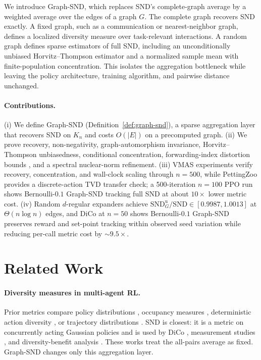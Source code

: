 \documentclass{article}
\theoremstyle{plain}
\theoremstyle{definition}
\theoremstyle{remark}
\newcommand{\SND}{\ensuremath{\mathrm{SND}}}
\newcommand{\SNDG}{\mathrm{SND}_{G}}
\begin{document}
We introduce Graph-SND, which replaces SND's complete-graph average by a
weighted average over the edges of a graph $G$. The complete graph recovers
SND exactly. A fixed graph, such as a communication or nearest-neighbor
graph, defines a localized diversity measure over task-relevant
interactions. A random graph defines sparse estimators of full SND,
including an unconditionally unbiased Horvitz--Thompson estimator and a
normalized sample mean with finite-population concentration. This isolates
the aggregation bottleneck while leaving the policy architecture, training
algorithm, and pairwise distance unchanged.

\paragraph{Contributions.}
(i) We define Graph-SND (Definition~\ref{def:graph-snd}), a sparse
aggregation layer that recovers SND on $K_n$ and costs $O(|E|)$ on a
precomputed graph. (ii) We prove recovery, non-negativity,
graph-automorphism invariance, Horvitz--Thompson unbiasedness,
conditional concentration, forwarding-index distortion bounds
\citep{heydemann1989forwarding,leighton1999multicommodity}, and a
spectral nuclear-norm refinement. (iii) VMAS experiments
\citep{bettini2022vmas} verify recovery, concentration, and wall-clock
scaling through $n=500$, while PettingZoo provides a discrete-action
TVD transfer check; a 500-iteration $n=100$ PPO run
shows Bernoulli-$0.1$ Graph-SND tracking full SND at about $10\times$
lower metric cost. (iv) Random $d$-regular expanders achieve
$\SNDG^{\mathrm{u}}/\SND\in[0.9987,1.0013]$ at
$\Theta(n\log n)$ edges, and DiCo at $n=50$ shows Bernoulli-$0.1$
Graph-SND preserves reward and set-point tracking within observed seed
variation while reducing per-call metric cost by ${\sim}9.5\times$.

\section{Related Work}
\label{sec:related}

\paragraph{Diversity measures in multi-agent RL.}
Prior metrics compare policy distributions
\citep{mckee2022diversity,yu2021informative,hu2022policy}, occupancy
measures \citep{liu2021unifying}, deterministic action diversity
\citep{parker-holder2020effective}, or trajectory distributions
\citep{lupu2021trajedi}. SND \citep{bettini2025snd} is closest: it is a
metric on concurrently acting Gaussian policies and is used by DiCo
\citep{bettini2024dico}, measurement studies
\citep{bettini2024impact,tessera2024hypermarl}, and diversity-benefit
analysis \citep{amir2025diversity}. These works treat the all-pairs
average as fixed. Graph-SND changes only this aggregation layer.
\end{document}
